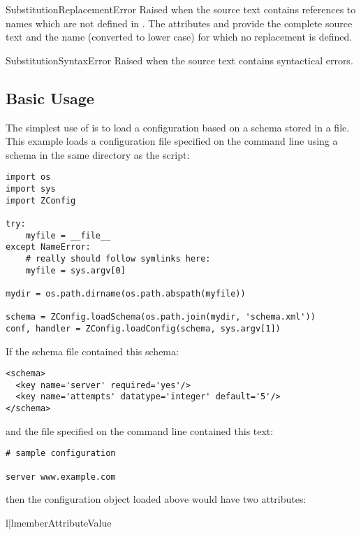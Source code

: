 \documentclass{howto}
\begin{document}
\begin{excdesc}{SubstitutionReplacementError}
  Raised when the source text contains references to names which are
  not defined in .  The attributes  and
   provide the complete source text and the name
  (converted to lower case) for which no replacement is defined.
\end{excdesc}

\begin{excdesc}{SubstitutionSyntaxError}
  Raised when the source text contains syntactical errors.
\end{excdesc}


\subsection{Basic Usage}

The simplest use of  is to load a configuration
based on a schema stored in a file.  This example loads a
configuration file specified on the command line using a schema in the
same directory as the script:

\begin{verbatim}
import os
import sys
import ZConfig

try:
    myfile = __file__
except NameError:
    # really should follow symlinks here:
    myfile = sys.argv[0]

mydir = os.path.dirname(os.path.abspath(myfile))

schema = ZConfig.loadSchema(os.path.join(mydir, 'schema.xml'))
conf, handler = ZConfig.loadConfig(schema, sys.argv[1])
\end{verbatim}

If the schema file contained this schema:

\begin{verbatim}
<schema>
  <key name='server' required='yes'/>
  <key name='attempts' datatype='integer' default='5'/>
</schema>
\end{verbatim}

and the file specified on the command line contained this text:

\begin{verbatim}
# sample configuration

server www.example.com
\end{verbatim}

then the configuration object  loaded above would have two
attributes:

\begin{tableii}{l|l}{member}{Attribute}{Value}
\end{tableii}
\end{document}
